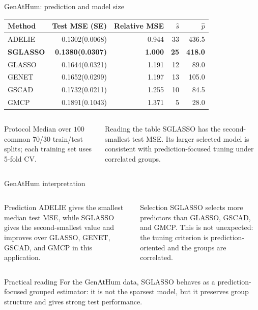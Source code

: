 \documentclass[newPxFont,nosectionpage]{beamer}
\begin{document}
\begin{frame}{GenAtHum: prediction and model size}
\scriptsize
\centering
\renewcommand{\arraystretch}{1.25}
\begin{tabular}{lrrrr}
\toprule
Method & Test MSE (SE) & Relative MSE & $\widehat{s}$ & $\widehat{p}$ \\
\midrule
ADELIE  & 0.1302\;(0.0068) & 0.944 & 33 & 436.5 \\
\textbf{SGLASSO} & \textbf{0.1380\;(0.0307)} & \textbf{1.000} & \textbf{25} & \textbf{418.0} \\
GLASSO  & 0.1644\;(0.0321) & 1.191 & 12 & 89.0 \\
GENET   & 0.1652\;(0.0299) & 1.197 & 13 & 105.0 \\
GSCAD   & 0.1732\;(0.0211) & 1.255 & 10 & 84.5 \\
GMCP    & 0.1891\;(0.1043) & 1.371 & 5 & 28.0 \\
\bottomrule
\end{tabular}

\vspace{0.7em}
\begin{columns}[T,onlytextwidth]
\begin{block}{Protocol}
Median over $100$ common 70/30 train/test splits; each training set uses 5-fold CV.
\end{block}
\begin{block}{Reading the table}
SGLASSO has the second-smallest test MSE. Its larger selected model is consistent with prediction-focused tuning under correlated groups.
\end{block}
\end{columns}
\end{frame}

\begin{frame}{GenAtHum interpretation}
\small
\begin{columns}[T,onlytextwidth]
\begin{block}{Prediction}
ADELIE gives the smallest median test MSE, while SGLASSO gives the second-smallest value and improves over GLASSO, GENET, GSCAD, and GMCP in this application.
\end{block}
\begin{block}{Selection}
SGLASSO selects more predictors than GLASSO, GSCAD, and GMCP. This is not unexpected: the tuning criterion is prediction-oriented and the groups are correlated.
\end{block}
\end{columns}
\vspace{0.35em}
\begin{alertblock}{Practical reading}
For the GenAtHum data, SGLASSO behaves as a prediction-focused grouped estimator: it is not the sparsest model, but it preserves group structure and gives strong test performance.
\end{alertblock}
\end{frame}
\end{document}
